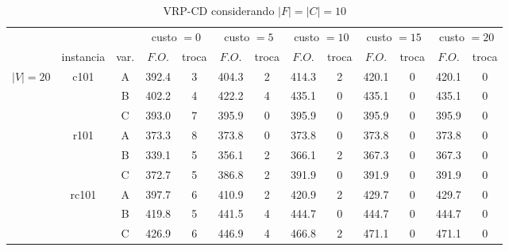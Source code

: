 \documentclass[12pt]{article}
\begin{document}
\begin{table}[!htb]
\centering
\footnotesize
\begin{tabular}{|c|c|c|c|c|c|c|c|c|c|c|c|c|}
\cline{4-13}
\multicolumn{3}{c}{} & \multicolumn{2}{|c}{custo $=0$} & \multicolumn{2}{|c|}{custo $=5$} & \multicolumn{2}{c|}{custo $=10$} & \multicolumn{2}{c|}{custo $=15$} & \multicolumn{2}{|c|}{custo $=20$}\\
\cline{2-13}
\multicolumn{1}{c}{} & \multicolumn{1}{|c}{instancia} & \multicolumn{1}{|c|}{var.} & \multicolumn{1}{|c|}{$F.O.$} & \multicolumn{1}{|c|}{troca} & \multicolumn{1}{|c|}{$F.O.$} & \multicolumn{1}{|c|}{troca} & \multicolumn{1}{|c|}{$F.O.$} & \multicolumn{1}{|c|}{troca} & \multicolumn{1}{|c|}{$F.O.$} & \multicolumn{1}{|c|}{troca} & \multicolumn{1}{|c|}{$F.O.$} & \multicolumn{1}{|c|}{troca} \\
\hline
\multirow{9}{*}{$|V|=20$}
& \multirow{3}{*}{c101} & A & 392.4 & 3 & 404.3 & 2 & 414.3 & 2 & 420.1 & 0 & 420.1 & 0 \\
\cline{3-13}
& \multirow{3}{*}{} & B & 402.2 & 4 & 422.2 & 4 & 435.1 & 0 & 435.1 & 0 & 435.1 & 0 \\
\cline{3-13}
& \multirow{3}{*}{} & C & 393.0 & 7 & 395.9 & 0 & 395.9 & 0 & 395.9 & 0 & 395.9 & 0 \\
\cline{2-13}
& \multirow{3}{*}{r101} & A & 373.3 & 8 & 373.8 & 0 & 373.8 & 0 & 373.8 & 0 & 373.8 & 0 \\ 
\cline{3-13}
& \multirow{3}{*}{} & B & 339.1 & 5 & 356.1 & 2 & 366.1 & 2 & 367.3 & 0 & 367.3 & 0 \\ 
\cline{3-13}
& \multirow{3}{*}{} & C & 372.7 & 5 & 386.8 & 2 & 391.9 & 0 & 391.9 & 0 & 391.9 & 0 \\
\cline{2-13}
& \multirow{3}{*}{rc101} & A & 397.7 & 6 & 410.9 & 2 & 420.9 & 2 & 429.7 & 0 & 429.7 & 0 \\ 
\cline{3-13}
& \multirow{3}{*}{} & B & 419.8 & 5 & 441.5 & 4 & 444.7 & 0 & 444.7 & 0 & 444.7 & 0 \\ 
\cline{3-13}
& \multirow{3}{*}{} & C & 426.9 & 6 & 446.9 & 4 & 466.8 & 2 & 471.1 & 0 & 471.1 & 0 \\
\hline
\end{tabular}
\caption{VRP-CD considerando $|F|=|C|=10$}
\label{tab:different-dynamic-approaches}
\end{table}
\end{document}
